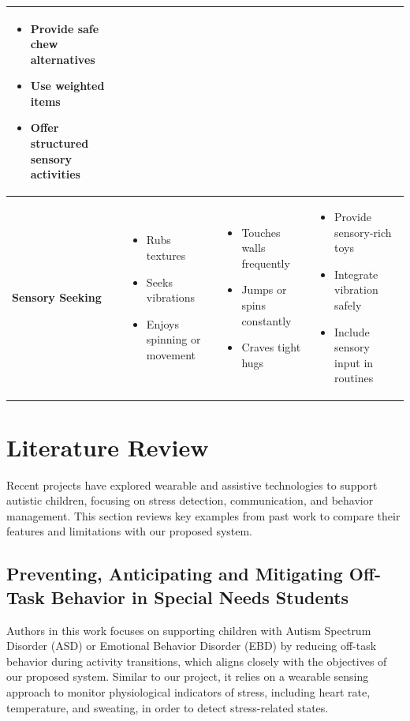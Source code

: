 \documentclass[a4paper,12pt]{report}
\begin{document}
\begin{table}[h]
\begin{tabular}{|p{3.2cm}|p{4.5cm}|p{4cm}|p{4.2cm}|}
\begin{itemize}[leftmargin=*, nosep]
  \item Provide safe chew alternatives
  \item Use weighted items
  \item Offer structured sensory activities
\end{itemize} \\
\hline
\textbf{Sensory Seeking }&
\begin{itemize}[leftmargin=*, nosep]
  \item Rubs textures
  \item Seeks vibrations
  \item Enjoys spinning or movement
\end{itemize} &
\begin{itemize}[leftmargin=*, nosep]
  \item Touches walls frequently
  \item Jumps or spins constantly
  \item Craves tight hugs
\end{itemize} &
\begin{itemize}[leftmargin=*, nosep]
  \item Provide sensory-rich toys
  \item Integrate vibration safely
  \item Include sensory input in routines
\end{itemize} \\
\hline
\end{tabular}
\label{tab:sensory_behaviors}
\end{table}

\section{Literature Review}
Recent projects have explored wearable and assistive technologies to support autistic children, focusing on stress detection, communication, and behavior management. This section reviews key examples from past work to compare their features and limitations with our proposed system.
\subsection{Preventing, Anticipating and Mitigating Off-Task Behavior in Special Needs Students}
Authors in this work \cite{ucf_offtask_behavior_project} focuses on supporting children with Autism Spectrum Disorder (ASD) or Emotional Behavior Disorder (EBD) by reducing off-task behavior during activity transitions, which aligns closely with the objectives of our proposed system. Similar to our project, it relies on a wearable sensing approach to monitor physiological indicators of stress, including heart rate, temperature, and sweating, in order to detect stress-related states.\\[0.01cm]
\end{document}

